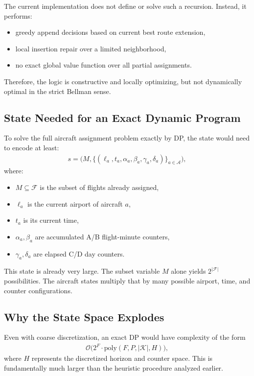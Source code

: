 \documentclass[11pt,a4paper]{article}
\begin{document}
The current implementation does not define or solve such a recursion. Instead, it performs:
\begin{itemize}[leftmargin=1.4em]
    \item greedy append decisions based on current best route extension,
    \item local insertion repair over a limited neighborhood,
    \item no exact global value function over all partial assignments.
\end{itemize}
Therefore, the logic is constructive and locally optimizing, but not dynamically optimal in the strict Bellman sense.

\subsection{State Needed for an Exact Dynamic Program}
To solve the full aircraft assignment problem exactly by DP, the state would need to encode at least:
\begin{align*}
s = \Big(M, \{(\ell_a, t_a, \alpha_a, \beta_a, \gamma_a, \delta_a)\}_{a \in \mathcal{A}}\Big),
\end{align*}
where:
\begin{itemize}[leftmargin=1.4em]
    \item $M \subseteq \mathcal{F}$ is the subset of flights already assigned,
    \item $\ell_a$ is the current airport of aircraft $a$,
    \item $t_a$ is its current time,
    \item $\alpha_a, \beta_a$ are accumulated A/B flight-minute counters,
    \item $\gamma_a, \delta_a$ are elapsed C/D day counters.
\end{itemize}

This state is already very large. The subset variable $M$ alone yields $2^{|\mathcal{F}|}$ possibilities. The aircraft states multiply that by many possible airport, time, and counter configurations.

\subsection{Why the State Space Explodes}
Even with coarse discretization, an exact DP would have complexity of the form
\begin{align*}
\mathcal{O}\bigl(2^F \cdot \mathrm{poly}(F,P,|\mathcal{K}|,H)\bigr),
\end{align*}
where $H$ represents the discretized horizon and counter space. This is fundamentally much larger than the heuristic procedure analyzed earlier.
\end{document}
